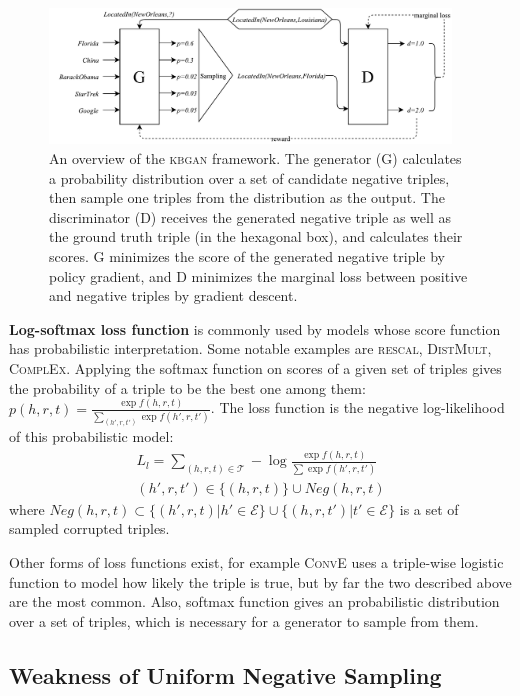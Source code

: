 \documentclass[11pt,a4paper]{article}
\begin{document}
\begin{figure}[t]
  \centering
    \includegraphics[width=0.95\textwidth]{kbgan_overview.pdf}
  \caption{An overview of the \textsc{kbgan} framework. The generator (G) calculates a probability distribution over a set of candidate negative triples, then sample one triples from the distribution as the output. The discriminator (D) receives the generated negative triple as well as the ground truth triple (in the hexagonal box), and calculates their scores. G minimizes the score of the generated negative triple by policy gradient, and D minimizes the marginal loss between positive and negative triples by gradient descent.}
  \label{fig:overview}
\end{figure}

\noindent \textbf{Log-softmax loss function} is commonly used by models whose score function has probabilistic interpretation. Some notable examples are \textsc{rescal}, \textsc{DistMult}, \textsc{ComplEx}. Applying the softmax function on scores of a given set of triples gives the probability of a triple to be the best one among them: $p(h,r,t)=\frac{\exp f(h,r,t)}{\sum_{(h',r,t')}\exp f(h',r,t')}$. The loss function is the negative log-likelihood of this probabilistic model:
\begin{multline}
L_{l}=\sum_{(h,r,t)\in\mathcal{T}}-\log \frac{\exp f(h,r,t)}{\sum\exp f(h',r,t')}\\
(h',r,t')\in\{(h,r,t)\}\cup Neg(h,r,t)\label{eq:nllloss}
\end{multline}
where $Neg(h,r,t)\subset\{(h',r,t)|h'\in\mathcal{E}\}\cup\{(h,r,t')|t'\in\mathcal{E}\}$ is a set of sampled corrupted triples.

Other forms of loss functions exist, for example \textsc{ConvE} uses a triple-wise logistic function to model how likely the triple is true, but by far the two described above are the most common. Also, softmax function gives an probabilistic distribution over a set of triples, which is necessary for a generator to sample from them.

\subsection{Weakness of Uniform Negative Sampling}
\end{document}
